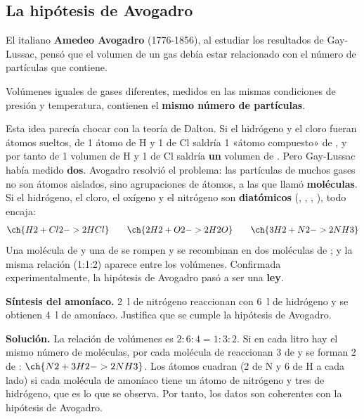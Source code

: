 \subsection{La hipótesis de Avogadro}

El italiano \textbf{Amedeo Avogadro} (1776-1856), al estudiar los resultados de Gay-Lussac, pensó que el volumen de un gas
debía estar relacionado con el número de partículas que contiene.

\begin{definition}
    Volúmenes iguales de gases diferentes, medidos en las mismas condiciones de presión y temperatura, contienen el
    \textbf{mismo número de partículas}.
\end{definition}

Esta idea parecía chocar con la teoría de Dalton. Si el hidrógeno y el cloro fueran átomos sueltos, de 1 átomo de H y 1 de Cl
saldría 1 «átomo compuesto» de , y por tanto de 1 volumen de H y 1 de Cl saldría \textbf{un} volumen de . Pero
Gay-Lussac había medido \textbf{dos}. Avogadro resolvió el problema: las partículas de muchos gases no son átomos aislados,
sino agrupaciones de átomos, a las que llamó \textbf{moléculas}. Si el hidrógeno, el cloro, el oxígeno y el nitrógeno son
\textbf{diatómicos} (, , , ), todo encaja:
\[ \ch{H2 + Cl2 -> 2 HCl} \qquad \ch{2 H2 + O2 -> 2 H2O} \qquad \ch{3 H2 + N2 -> 2 NH3} \]
Una molécula de  y una de  se rompen y se recombinan en dos moléculas de ; y la misma relación (1:1:2)
aparece entre los volúmenes. Confirmada experimentalmente, la hipótesis de Avogadro pasó a ser una \textbf{ley}.

\begin{example}
    \textbf{Síntesis del amoníaco.} \qty{2}{\litre} de nitrógeno reaccionan con \qty{6}{\litre} de hidrógeno y se obtienen
    \qty{4}{\litre} de amoníaco. Justifica que se cumple la hipótesis de Avogadro.

    \textbf{Solución.} La relación de volúmenes es \(2:6:4 = 1:3:2\). Si en cada litro hay el mismo número de moléculas, por
    cada molécula de  reaccionan 3 de  y se forman 2 de : \(\ch{N2 + 3 H2 -> 2 NH3}\). Los átomos cuadran
    (2 de N y 6 de H a cada lado) si cada molécula de amoníaco tiene un átomo de nitrógeno y tres de hidrógeno, que es lo que
    se observa. Por tanto, los datos son coherentes con la hipótesis de Avogadro.
\end{example}

